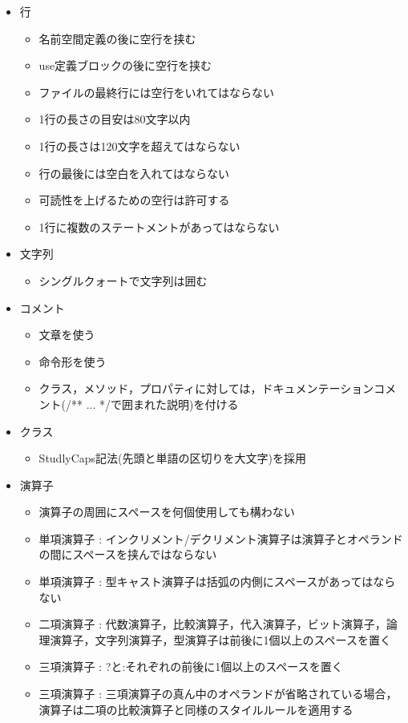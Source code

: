 \documentclass[a4paper, titlepage]{jsarticle}
\begin{document}
\begin{itemize}
\begin{itemize}
\begin{itemize}
    \end{itemize}
    \item 行
    \begin{itemize}
      \item 名前空間定義の後に空行を挟む
      \item use定義ブロックの後に空行を挟む
      \item ファイルの最終行には空行をいれてはならない
      \item 1行の長さの目安は80文字以内
      \item 1行の長さは120文字を超えてはならない
      \item 行の最後には空白を入れてはならない
      \item 可読性を上げるための空行は許可する
      \item 1行に複数のステートメントがあってはならない
    \end{itemize}
    \item 文字列
    \begin{itemize}
      \item シングルクォートで文字列は囲む
    \end{itemize}
    \item コメント
    \begin{itemize}
      \item 文章を使う
      \item 命令形を使う
      \item クラス，メソッド，プロパティに対しては，ドキュメンテーションコメント(/** ... */で囲まれた説明)を付ける
    \end{itemize}
    \item クラス
    \begin{itemize}
      \item StudlyCaps記法(先頭と単語の区切りを大文字)を採用
    \end{itemize}
    \item 演算子
    \begin{itemize}
      \item 演算子の周囲にスペースを何個使用しても構わない
      \item 単項演算子 : インクリメント/デクリメント演算子は演算子とオペランドの間にスペースを挟んではならない
      \item 単項演算子 : 型キャスト演算子は括弧の内側にスペースがあってはならない
      \item 二項演算子 : 代数演算子，比較演算子，代入演算子，ビット演算子，論理演算子，文字列演算子，型演算子は前後に1個以上のスペースを置く
      \item 三項演算子 : ?と:それぞれの前後に1個以上のスペースを置く
      \item 三項演算子 : 三項演算子の真ん中のオペランドが省略されている場合，演算子は二項の比較演算子と同様のスタイルルールを適用する
    \end{itemize}
  \end{itemize}
\end{itemize}
\clearpage
\end{document}
